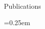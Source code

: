 \begin{small}
\begin{cvlist}{Publications}
\item
	\begin{itemize}\itemsep=0.25em

\end{itemize}
\end{cvlist}
\end{small}
